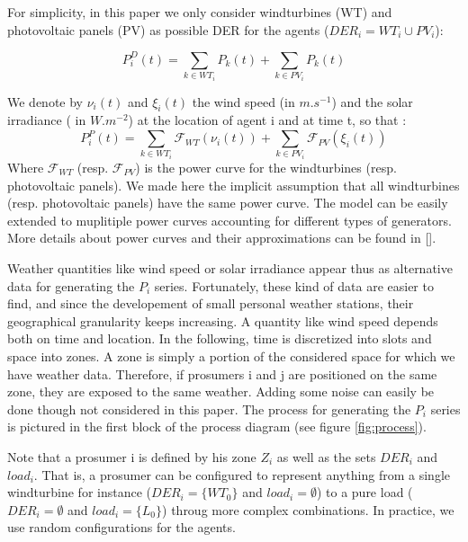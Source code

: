 \documentclass[conference]{IEEEtran}
\begin{document}
For simplicity, in this paper we only consider windturbines (WT) and photovoltaic panels (PV) as possible DER for the agents ($ DER_{i} = WT_{i} \cup PV_{i} $):  

\begin{equation}
P_{i}^{D}(t) = \sum_{k \in WT_{i}} P_{k}(t) + \sum_{k \in PV_{i}} P_{k}(t)
\end{equation} 

We denote by $ \nu_{i}(t) $ and $ \xi_{i}(t) $ the wind speed (in $ m.s^{-1} $) and the solar irradiance ( in $ W.m^{-2} $) at the location of agent i and at time t, so that :
\begin{equation}
 P_{i}^{P}(t) = \sum_{k \in WT_{i}} \mathcal{F}_{WT}( \nu_{i}(t) ) + \sum_{k \in PV_{i} } \mathcal{F}_{PV}(\xi_{i}(t) ) 
\end{equation}
Where $ \mathcal{F}_{WT} $ (resp. $ \mathcal{F}_{PV} $) is the power curve for the windturbines (resp. photovoltaic panels). We made here the implicit assumption that all windturbines (resp. photovoltaic panels) have the same power curve. The model can be easily extended to muplitiple power curves accounting for different types of generators. More details about power curves and their approximations can be found in []. 

Weather quantities like wind speed or solar irradiance appear thus as alternative data for generating the $ P_{i} $ series. Fortunately, these kind of data are easier to find, and since the developement of small personal weather stations, their geographical granularity keeps increasing.  A quantity like wind speed depends both on time and location. In the following, time is discretized into slots and space into zones. A zone is simply a portion of the considered space for which we have weather data. Therefore, if prosumers i and j are positioned on the same zone, they are exposed to the same weather. Adding some noise can easily be done though not considered in this paper. The process for generating the $ P_{i} $ series is pictured in the first block of the process diagram (see figure \ref{fig:process}).

Note that a prosumer i is defined by his zone $ Z_{i} $ as well as the sets $ DER_{i} $ and $ load_{i} $. That is, a prosumer can be configured to represent anything from a single windturbine for instance ($ DER_{i} = \{ WT_{0} \} $ and $ load_{i} = \emptyset $) to a pure load ($ DER_{i} = \emptyset $ and $ load_{i} = \{ L_{0} \} $) throug more complex combinations. In practice, we use random configurations for the agents.
\end{document}
